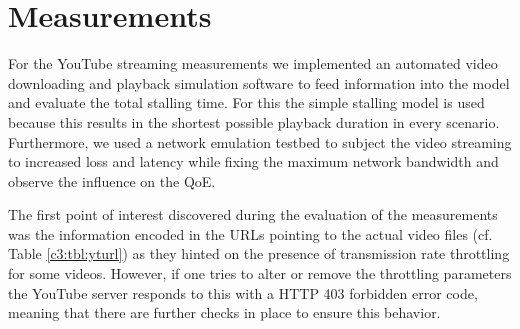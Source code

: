 \section{Measurements}
\label{c3:measurements}



For the YouTube streaming measurements we implemented an automated video downloading and playback simulation software to feed information into the model and evaluate the total stalling time. For this the simple stalling model is used because this results in the shortest possible playback duration in every scenario. Furthermore, we used a network emulation testbed to subject the video streaming to increased loss and latency while fixing the maximum network bandwidth and observe the influence on the QoE.

The first point of interest discovered during the evaluation of the measurements was the information encoded in the URLs pointing to the actual video files (cf. Table \ref{c3:tbl:yturl}) as they hinted on the presence of transmission rate throttling for some videos. However, if one tries to alter or remove the throttling parameters the YouTube server responds to this with a HTTP 403 forbidden error code, meaning that there are further checks in place to ensure this behavior. 

